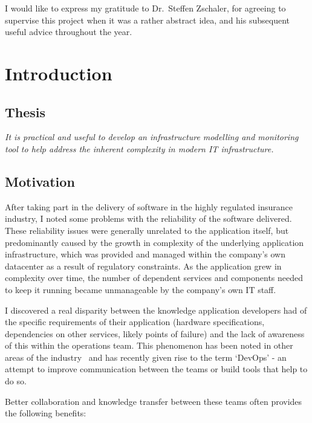 \documentclass{cshonours}
\begin{document}
I would like to express my gratitude to Dr.\ Steffen Zschaler, for agreeing to supervise this project when it was a rather abstract idea, and his subsequent useful advice throughout the year.

\tableofcontents

\chapter{Introduction}

\section{Thesis}
\textit{It is practical and useful to develop an infrastructure modelling and monitoring tool to help address the inherent complexity in modern IT infrastructure.}
\section{Motivation}

After taking part in the delivery of software in the highly regulated insurance industry, I noted some problems with the reliability of the software delivered. These reliability issues were generally unrelated to the application itself, but predominantly caused by the growth in complexity of the underlying application infrastructure, which was provided and managed within the company's own datacenter as a result of regulatory constraints. As the application grew in complexity over time, the number of dependent services and components needed to keep it running became unmanageable by the company's own IT staff.

I discovered a real disparity between the knowledge application developers had of the specific requirements of their application (hardware specifications, dependencies on other services, likely points of failure) and the lack of awareness of this within the operations team. This phenomenon has been noted in other areas of the industry~\cite{DevOps} and has recently given rise to the term `DevOps' - an attempt to improve communication between the teams or build tools that help to do so.

Better collaboration and knowledge transfer between these teams often provides the following benefits:
\end{document}
